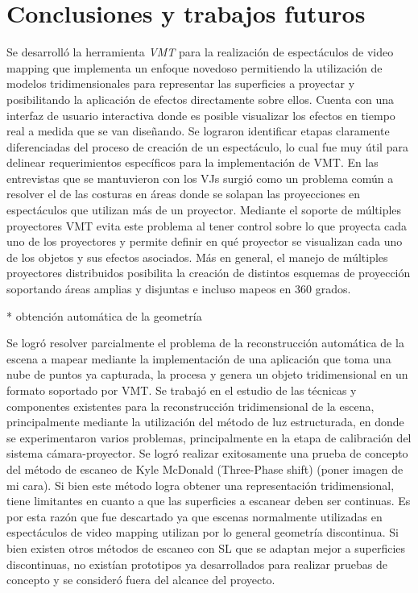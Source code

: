 ﻿\chapter{Conclusiones y trabajos futuros}

Se desarrolló la herramienta \emph{VMT} para la realización de espectáculos de video mapping que implementa un enfoque novedoso permitiendo la utilización de modelos tridimensionales para representar las superficies a proyectar y posibilitando la aplicación de efectos directamente sobre ellos. Cuenta con una interfaz de usuario interactiva donde es posible visualizar los efectos en tiempo real a medida que se van diseñando.
Se lograron identificar etapas claramente diferenciadas del proceso de creación de un espectáculo, lo cual fue muy útil para delinear requerimientos específicos para la implementación de VMT. 
En las entrevistas que se mantuvieron con los VJs surgió como un problema común a resolver el de las costuras en áreas donde se solapan las proyecciones en espectáculos que utilizan más de un proyector. Mediante el soporte de múltiples proyectores VMT evita este problema al tener control sobre lo que proyecta cada uno de los proyectores y permite definir en qué proyector se visualizan cada uno de los objetos y sus efectos asociados. Más en general, el manejo de múltiples proyectores distribuidos posibilita la creación de distintos esquemas de proyección soportando áreas amplias y disjuntas e incluso mapeos en 360 grados.

* obtención automática de la geometría

Se logró resolver parcialmente el problema de la reconstrucción automática de la escena a mapear mediante la implementación de una aplicación que toma una nube de puntos ya capturada, la procesa y genera un objeto tridimensional en un formato soportado por VMT.
Se trabajó en el estudio de las técnicas y componentes existentes para la reconstrucción tridimensional de la escena, principalmente mediante la utilización del método de luz estructurada, en donde se experimentaron varios problemas, principalmente en la etapa de calibración del sistema cámara-proyector. 
Se logró realizar exitosamente una prueba de concepto del método de escaneo de Kyle McDonald  (Three-Phase shift) (poner imagen de mi cara). Si bien este método logra obtener una representación tridimensional, tiene limitantes en cuanto a que las superficies a escanear deben ser continuas. Es por esta razón que fue descartado ya que escenas normalmente utilizadas en espectáculos de video mapping utilizan por lo general geometría discontinua.
Si bien existen otros métodos de escaneo con SL que se adaptan mejor a superficies discontinuas, no existían prototipos ya desarrollados para realizar pruebas de concepto y se consideró fuera del alcance del proyecto.

